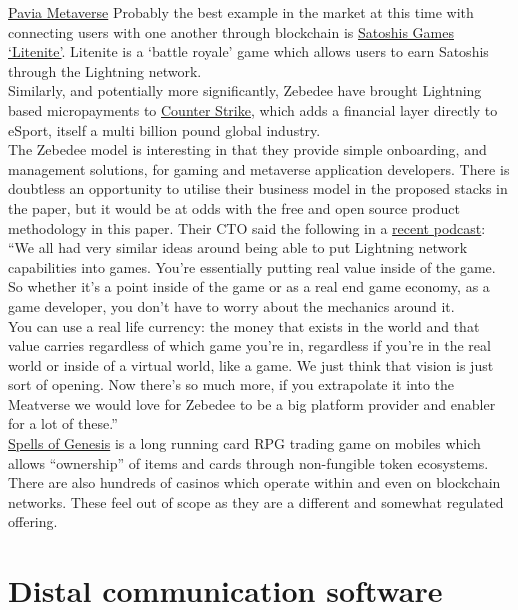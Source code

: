 \href{https://www.thesun.co.uk/tech/17348918/pavia-metaverse-cardano-crypto-game/}{Pavia Metaverse}
Probably the best example in the market at this time with connecting users with one another through blockchain is \href{https://lightnite.io/}{Satoshis Games `Litenite'}. Litenite is a `battle royale' game which allows users to earn Satoshis through the Lightning network.\\
Similarly, and potentially more significantly, Zebedee have brought Lightning based micropayments to \href{https://zebedee.io/infuse/}{Counter Strike}, which adds a financial layer directly to eSport, itself a multi billion pound global industry.\\
The Zebedee model is interesting in that they provide simple onboarding, and management solutions, for gaming and metaverse application developers. There is doubtless an opportunity to utilise their business model in the proposed stacks in the paper, but it would be at odds with the free and open source product methodology in this paper. Their CTO said the following in a \href{https://lightningjunkies.net/lightning-address-making-lightning-user-friendly-lnj052/}{recent podcast}:\\
``We all had very similar ideas around being able to put Lightning network capabilities into games. You're essentially putting real value inside of the game. So whether it's a point inside of the game or as a real end game economy, as a game developer, you don't have to worry about the mechanics around it.\\
You can use a real life currency: the money that exists in the world and that value carries regardless of which game you're in, regardless if you're in the real world or inside of a virtual world, like a game. We just think that vision is just sort of opening. Now there's so much more, if you extrapolate it into the Meatverse we would love for Zebedee to be a big platform provider and enabler for a lot of these.''\\
\href{https://spellsofgenesis.com/}{Spells of Genesis} is a long running card RPG trading game on mobiles which allows ``ownership'' of items and cards through non-fungible token ecosystems.\\
There are also hundreds of casinos which operate within and even on blockchain networks. These feel out of scope as they are a different and somewhat regulated offering.

\section{Distal communication software}
